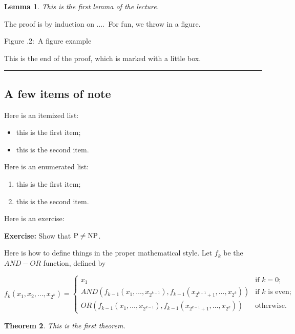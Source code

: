 \documentclass[twoside]{article}
\newcounter{lecnum}
\newcommand{\fig}[3]{
			\vspace{#2}
			\begin{center}
			Figure \thelecnum.#1:~#3
			\end{center}
	}
\newtheorem{theorem}{Theorem}[lecnum]
\newtheorem{lemma}[theorem]{Lemma}
\newenvironment{proof}{{\bf Proof:}}{\hfill\rule{2mm}{2mm}}
\begin{document}
\begin{lemma}
This is the first lemma of the lecture.
\end{lemma}

\begin{proof}
The proof is by induction on $\ldots$.\
For fun, we throw in a figure.
\fig{2}{1in}{A figure example}

This is the end of the proof, which is marked with a little box.
\end{proof}

\subsection{A few items of note}

Here is an itemized list:
\begin{itemize}
\item this is the first item;
\item this is the second item.
\end{itemize}

Here is an enumerated list:
\begin{enumerate}
\item this is the first item;
\item this is the second item.
\end{enumerate}

Here is an exercise:

{\bf Exercise:}  Show that ${\rm P}\ne{\rm NP}$.

Here is how to define things in the proper mathematical style.
Let $f_k$ be the $AND-OR$ function, defined by

\[ f_k(x_1, x_2, \ldots, x_{2^k}) = \left\{ \begin{array}{ll}

	x_1 & \mbox{if $k = 0$;} \\

	AND(f_{k-1}(x_1, \ldots, x_{2^{k-1}}),
	   f_{k-1}(x_{2^{k-1} + 1}, \ldots, x_{2^k}))
	 & \mbox{if $k$ is even;} \\

	OR(f_{k-1}(x_1, \ldots, x_{2^{k-1}}),
	   f_{k-1}(x_{2^{k-1} + 1}, \ldots, x_{2^k}))	
	& \mbox{otherwise.} 
	\end{array}
	\right. \]

\begin{theorem}
This is the first theorem.
\end{theorem}
\end{document}
